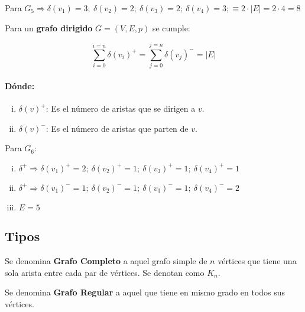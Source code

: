 \ejem Para $G_5 \Rightarrow \delta(v_1) = 3;\ \delta(v_2) = 2;\ \delta(v_3) = 
2;\ \delta(v_4) = 3; \equiv 2\cdot |E| = 2 \cdot 4 = 8$

{\thm Para un \textbf{grafo dirigido} $G = (V,E,p)$ se cumple:}

\begin{equation}
\sum\limits_{i = 0}^{i= n} \delta(v_i)^+ = \sum\limits_{j = 0}^{j= n} 
\delta(v_j)^- = |E|
\end{equation}

\paragraph*{Dónde:}

\begin{enumerate}[i.]

\item $\delta(v)^+$: Es el número de aristas que se dirigen a $v$.

\item $\delta(v)^-$: Es el número de aristas que parten de $v$.

\end{enumerate}

\ejem Para $G_6$:

\begin{enumerate}[i.]

\item $\delta^+ \Rightarrow \delta(v_1)^+ = 2;\ \delta(v_2)^+ = 1;\ 
\delta(v_3)^+ = 1;\ \delta(v_4)^+ = 1$

\item $\delta^+ \Rightarrow \delta(v_1)^- = 1;\ \delta(v_2)^- = 1;\ 
\delta(v_3)^-= 1;\ \delta(v_4)^- = 2$

\item $E = 5$

\end{enumerate}

\subsection{Tipos}


 Se denomina \textbf{Grafo Completo} a aquel grafo simple de $n$ vértices 
que tiene una sola arista entre cada  par de vértices. Se denotan como $K_n$.


 Se denomina \textbf{Grafo Regular} a aquel que tiene en mismo grado en 
todos sus vértices.

